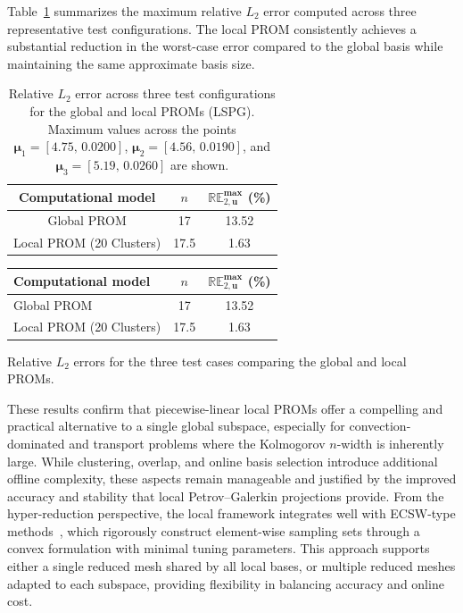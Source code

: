 Table~\ref{tab:local_global_pod_error_summary} summarizes the maximum relative $L_2$ error computed across three representative test configurations.  
The local PROM consistently achieves a substantial reduction in the worst-case error compared to the global basis while maintaining the same approximate basis size.

\begin{table}[htbp]
    \centering
    \begin{tabular}{c c c}
        \toprule
        Computational model & $n$ & $\mathbb{RE}^{\textbf{max}}_{2, \mathbf{u}}$ (\%) \\
        \midrule
        Global PROM & 17 & 13.52 \\
        Local PROM (20 Clusters) & 17.5 & 1.63 \\
        \bottomrule
    \end{tabular}
    \caption{Relative $L_2$ error across three test configurations for the global and local PROMs (LSPG). Maximum values across the points $\boldsymbol{\mu}_1 = [4.75,\, 0.0200]$, $\boldsymbol{\mu}_2 = [4.56,\, 0.0190]$, and $\boldsymbol{\mu}_3 = [5.19,\, 0.0260]$ are shown.}
    \label{tab:local_global_pod_error_summary}
\end{table}

\begin{table}[htbp]
\centering
\begin{tabular}{l c c}
    \toprule
        Computational model & $n$ & $\mathbb{RE}^{\textbf{max}}_{2, \mathbf{u}}$ (\%) \\
        \midrule
        Global PROM & 17 & 13.52 \\
        Local PROM (20 Clusters) & 17.5 & 1.63 \\
        \bottomrule
\end{tabular}

\medskip
{\small
Relative $L_2$ errors for the three test cases comparing the global and local PROMs.
}
\end{table}


These results confirm that piecewise-linear local PROMs offer a compelling and practical alternative to a single global subspace, especially for convection-dominated and transport problems where the Kolmogorov $n$-width is inherently large. While clustering, overlap, and online basis selection introduce additional offline complexity, these aspects remain manageable and justified by the improved accuracy and stability that local Petrov--Galerkin projections provide. From the hyper-reduction perspective, the local framework integrates well with ECSW-type methods~\cite{grimberg2021mesh}, which rigorously construct element-wise sampling sets through a convex formulation with minimal tuning parameters. This approach supports either a single reduced mesh shared by all local bases, or multiple reduced meshes adapted to each subspace, providing flexibility in balancing accuracy and online cost.

